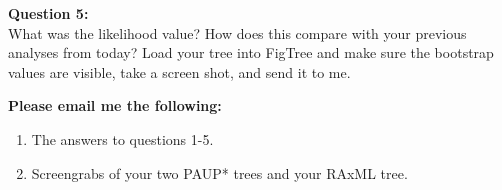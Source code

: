\documentclass[11pt]{article}
\begin{document}
\begin{framed}
\noindent
\textbf{Question 5:} \\
What was the likelihood value?  How does this compare with your previous analyses from today?  Load your tree into FigTree and make sure the bootstrap values are visible, take a screen shot, and send it to me. 
\end{framed}

\begin{framed}
\noindent
\textbf{Please email me the following:}
\begin{enumerate}
  \item The answers to questions 1-5.
  \item Screengrabs of your two PAUP* trees and your RAxML tree.
\end{enumerate}
\end{framed}


 
\end{document}
